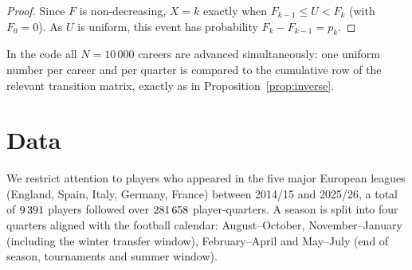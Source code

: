 \documentclass[11pt]{amsart}
\theoremstyle{definition}
\theoremstyle{remark}
\begin{document}
\begin{proof}
Since $F$ is non-decreasing, $X=k$ exactly when $F_{k-1}\le U<F_k$ (with $F_0=0$). As $U$ is uniform, this event has probability $F_k-F_{k-1}=p_k$.
\end{proof}

In the code all $N=10\,000$ careers are advanced simultaneously: one uniform number per career and per quarter is compared to the cumulative row of the relevant transition matrix, exactly as in Proposition~\ref{prop:inverse}.

\section{Data}\label{sec:data}

We restrict attention to players who appeared in the five major European leagues (England, Spain, Italy, Germany, France) between 2014/15 and 2025/26, a total of $9\,391$ players followed over $281\,658$ player-quarters. A season is split into four quarters aligned with the football calendar: August--October, November--January (including the winter transfer window), February--April and May--July (end of season, tournaments and summer window).
\end{document}
